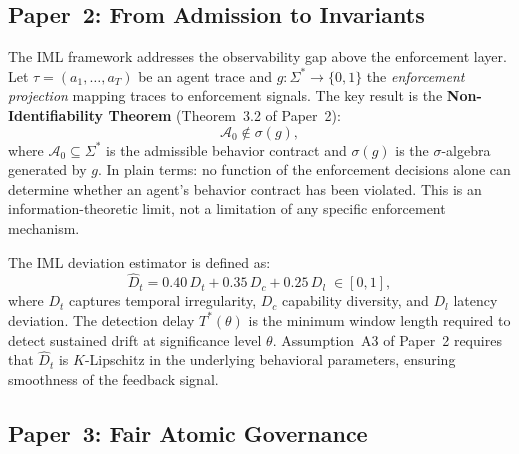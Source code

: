 \documentclass[11pt]{article}
\newcommand{\Dhat}{\widehat{D}}
\newcommand{\Azero}{\mathcal{A}_0}
\begin{document}
\subsection{Paper~2: From Admission to Invariants~\cite{fernandez2026c}}

The IML framework addresses the observability gap above the enforcement layer.
Let $\tau = (a_1, \ldots, a_T)$ be an agent trace and
$g: \Sigma^* \to \{0,1\}$ the \emph{enforcement projection} mapping traces to
enforcement signals. The key result is the \textbf{Non-Identifiability Theorem}
(Theorem~3.2 of Paper~2):
\[
  \Azero \notin \sigma(g),
\]
where $\Azero \subseteq \Sigma^*$ is the admissible behavior contract and
$\sigma(g)$ is the $\sigma$-algebra generated by $g$. In plain terms: no
function of the enforcement decisions alone can determine whether an agent's
behavior contract has been violated. This is an information-theoretic limit,
not a limitation of any specific enforcement mechanism.

The IML deviation estimator is defined as:
\[
  \Dhat_t = 0.40\, D_t + 0.35\, D_c + 0.25\, D_l \;\in [0,1],
\]
where $D_t$ captures temporal irregularity, $D_c$ capability diversity, and
$D_l$ latency deviation. The detection delay $T^*(\theta)$ is the minimum
window length required to detect sustained drift at significance level
$\theta$. Assumption~A3 of Paper~2 requires that $\Dhat_t$ is $K$-Lipschitz
in the underlying behavioral parameters, ensuring smoothness of the
feedback signal.

\subsection{Paper~3: Fair Atomic Governance~\cite{fairgov26}}
\end{document}
